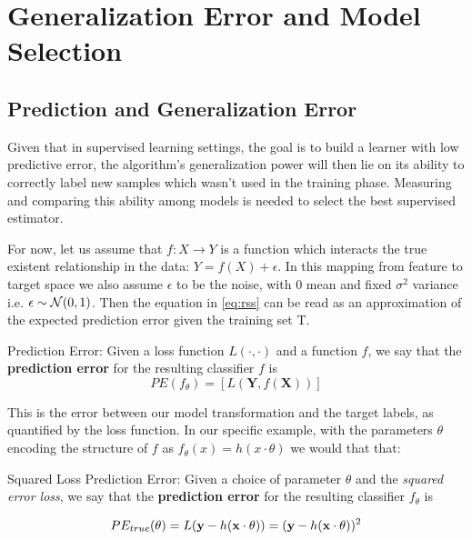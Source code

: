 
\chapter{Generalization Error and Model Selection } \label{cha:modelSelection}



\section{Prediction and Generalization Error} \label{subsection-generalizationError}

Given that in supervised learning settings, the goal is to build a learner with low predictive error, the algorithm's generalization power will then lie on its ability to correctly label new samples which wasn't used in the training phase. Measuring and comparing this ability among models is needed to select the best supervised estimator. 

For now, let us assume that $f: X \rightarrow Y$ is a function which interacts the true existent relationship in the data: $Y = f(X) + \epsilon$. In this mapping from feature to target space we also assume $\epsilon$ to be the noise, with $0$ mean and fixed $\sigma^2$ variance i.e. $\epsilon \sim \operatorname{\mathcal{N}}(0,1) $. Then the equation in \cref{eq:rss} can be read as an approximation of the expected prediction error given the training set $\mathrm{T}$.


\begin{definition}{Prediction Error:}
	Given a loss function $L(\cdot,\cdot)$ and a function $f$, we say that the \textbf{prediction error} for the resulting classifier $f$ is
	\[ 
	PE(f_\theta)= \left[ L(\textbf{Y},f(\textbf{X}))\right]
	\]
\end{definition}

This is the error between our model transformation and the target labels, as quantified by the loss function.  In our specific example, with the parameters $\theta$ encoding the structure of $f$ as $f_\theta(x) = h(x \cdot \theta)$ we would that that:

\begin{definition}{Squared Loss Prediction Error:}
	Given a choice of parameter $\theta$ and the \textit{squared error loss}, we say that the \textbf{prediction error} for the resulting classifier $f_\theta$ is
	
	\begin{equation}
	PE_{true}(\theta) =L(\textbf{y} - h(\textbf{x} \cdot \theta) )  \\
	=  (\textbf{y} - h(\textbf{x} \cdot \theta) )^2 
	\end{equation}
	
\end{definition}

